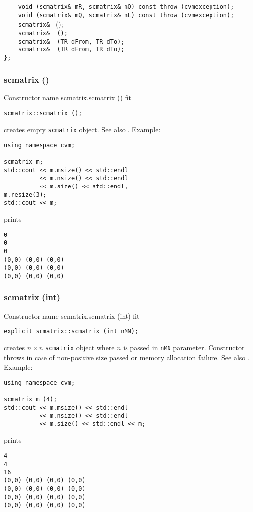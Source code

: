 \verb"    void "\verb"(scmatrix& mR, scmatrix& mQ) const throw (cvmexception);"\\
\verb"    void "\verb"(scmatrix& mQ, scmatrix& mL) const throw (cvmexception);"\\
\verb"    scmatrix& " ();\\
\verb"    scmatrix& "\verb" ();"\\
\verb"    scmatrix& "\verb" (TR dFrom, TR dTo);"\\
\verb"    scmatrix& "\verb" (TR dFrom, TR dTo);"\\
\verb"};"
\newpage


\subsubsection{scmatrix ()}
Constructor%
\pdfdest name {scmatrix.scmatrix ()} fit
\begin{verbatim}
scmatrix::scmatrix ();
\end{verbatim}
creates  empty \verb"scmatrix" object.
See also .
Example:
\begin{Verbatim}
using namespace cvm;

scmatrix m;
std::cout << m.msize() << std::endl 
          << m.nsize() << std::endl
          << m.size() << std::endl;
m.resize(3);
std::cout << m;
\end{Verbatim}
prints
\begin{Verbatim}
0
0
0
(0,0) (0,0) (0,0)
(0,0) (0,0) (0,0)
(0,0) (0,0) (0,0)
\end{Verbatim}
\newpage



\subsubsection{scmatrix (int)}
Constructor%
\pdfdest name {scmatrix.scmatrix (int)} fit
\begin{verbatim}
explicit scmatrix::scmatrix (int nMN);
\end{verbatim}
creates  $n\times n$ \verb"scmatrix" object where $n$ is passed in
\verb"nMN" parameter.
Constructor throws  
in case of non-positive size passed or memory allocation failure.
See also .
Example:
\begin{Verbatim}
using namespace cvm;

scmatrix m (4);
std::cout << m.msize() << std::endl 
          << m.nsize() << std::endl
          << m.size() << std::endl << m;
\end{Verbatim}
prints
\begin{Verbatim}
4
4
16
(0,0) (0,0) (0,0) (0,0)
(0,0) (0,0) (0,0) (0,0)
(0,0) (0,0) (0,0) (0,0)
(0,0) (0,0) (0,0) (0,0)
\end{Verbatim}
\newpage




